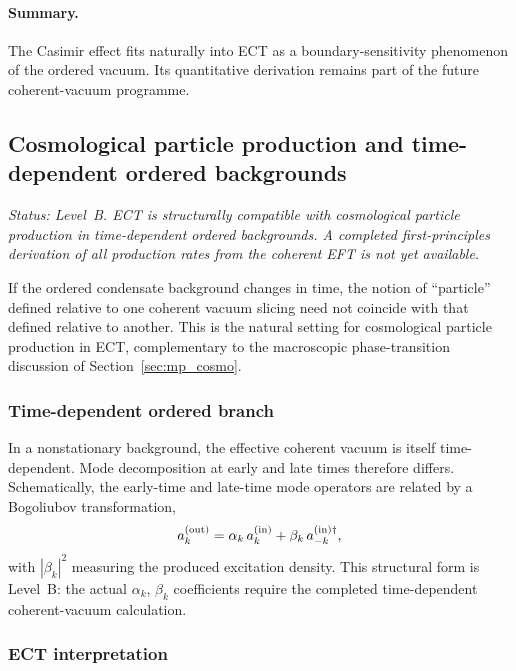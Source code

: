 \documentclass[11pt,a4paper]{article}
\numberwithin{equation}{section}
\begin{document}
\paragraph{Summary.}
The Casimir effect fits naturally into ECT as a boundary-sensitivity
phenomenon of the ordered vacuum.
Its quantitative derivation remains part of the future
coherent-vacuum programme.

\subsection{Cosmological particle production and time-dependent ordered backgrounds}
\label{sec:qs_particle_production}

\textit{Status: Level~B.
ECT is structurally compatible with cosmological particle production
in time-dependent ordered backgrounds.
A completed first-principles derivation of all production rates from
the coherent EFT is not yet available.}

\medskip
If the ordered condensate background changes in time, the notion of
``particle'' defined relative to one coherent vacuum slicing need not
coincide with that defined relative to another.
This is the natural setting for cosmological particle production in ECT,
complementary to the macroscopic phase-transition discussion
of Section~\ref{sec:mp_cosmo}.

\subsubsection*{Time-dependent ordered branch}

In a nonstationary background, the effective coherent vacuum is itself
time-dependent.
Mode decomposition at early and late times therefore differs.
Schematically, the early-time and late-time mode operators are related
by a Bogoliubov transformation,
\begin{equation}
  \label{eq:qs_bogoliubov}
  a_k^{\rm(out)}
  =
  \alpha_k\,a_k^{\rm(in)}
  +
  \beta_k\,a_{-k}^{\rm(in)\dagger},
\end{equation}
with $|\beta_k|^2$ measuring the produced excitation density.
This structural form is Level~B: the actual $\alpha_k$, $\beta_k$
coefficients require the completed time-dependent coherent-vacuum
calculation.

\subsubsection*{ECT interpretation}
\end{document}
